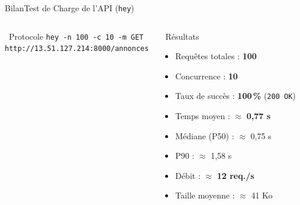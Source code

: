 \begin{frame}{Bilan}{Test de Charge de l'API (\texttt{hey})}
  \begin{columns}[T]
      \begin{block}{\faTerminal\ Protocole}
        \footnotesize
        \texttt{hey -n 100 -c 10 -m GET}\\\texttt{http://13.51.127.214:8000/annonces}
      \end{block}
      \begin{block}{\faChartLine\ Résultats}
        \begin{itemize}
          \setlength{\itemsep}{4pt}
          \item Requêtes totales : \textbf{100}
          \item Concurrence : \textbf{10}
          \item Taux de succès : \textbf{100\,\%} (\texttt{200 OK})
          \item Temps moyen : $\approx$ \textbf{0{,}77 s}
          \item Médiane (P50) : $\approx$ 0{,}75 s
          \item P90 : $\approx$ 1{,}58 s
          \item Débit : $\approx$ \textbf{12 req./s}
          \item Taille moyenne : $\approx$ 41 Ko
        \end{itemize}
      \end{block}


\end{columns}
\end{frame}
